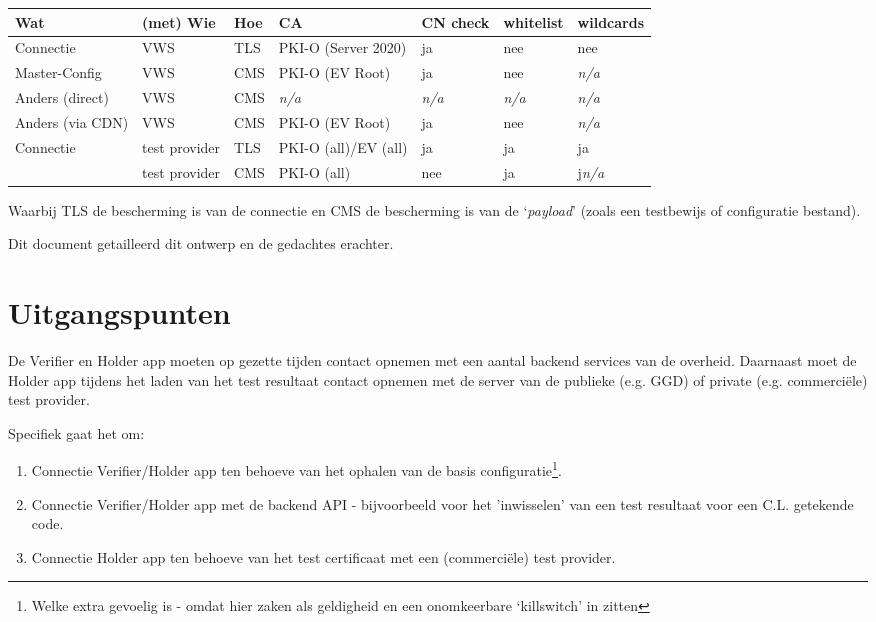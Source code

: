 \documentclass[11.0pt,twoside,openright]{report}
\begin{document}
\begin{tabular}{|l|l|l|l|l|l|l|}
\hline
Wat						& (met) Wie					& Hoe	& CA						& CN check & whitelist & wildcards  \\
\hline
\hline
Connectie				& VWS						& TLS 	& PKI-O (Server 2020)	& ja			& nee		& nee \\
Master-Config			& VWS						& CMS 	& PKI-O (EV Root)  		& ja			& nee		& \emph{n/a} \\
Anders (direct)			& VWS						& CMS	& \emph{n/a}		  		& \emph{n/a}	& \emph{n/a}& \emph{n/a} \\
Anders (via CDN)		& VWS						& CMS	& PKI-O (EV Root)  		& ja			& nee 		& \emph{n/a} \\
Connectie				& test provider 				& TLS 	& PKI-O (all)/EV (all) 	& ja 			& ja 		& ja \\
						& test provider 				& CMS 	& PKI-O (all) 			& nee 			& ja 		& j\emph{n/a} \\
\hline
\end{tabular}

Waarbij TLS de bescherming is van de connectie en CMS de bescherming is van de `\emph{payload}' (zoals een testbewijs of configuratie bestand).

Dit document getailleerd dit ontwerp en de gedachtes erachter.

\pagebreak
\section*{Uitgangspunten}

De Verifier en Holder app moeten op gezette tijden contact opnemen met een aantal backend services van de overheid. Daarnaast moet de Holder app tijdens het laden van het test resultaat contact opnemen met de server van de publieke (e.g. GGD) of private (e.g. commerciële) test provider. 

Specifiek gaat het om:

\begin{enumerate}
\item	Connectie Verifier/Holder app ten behoeve van het ophalen van de basis configuratie\footnote{Welke extra gevoelig is - omdat hier zaken als geldigheid en een onomkeerbare `killswitch' in zitten}.
\item	Connectie Verifier/Holder app met de backend API - bijvoorbeeld voor het 'inwisselen' van een test resultaat voor een C.L. getekende code.
\item 	Connectie Holder app ten behoeve van het test certificaat met een (commerciële) test provider. 
\end{enumerate}
\end{document}
